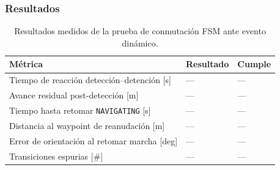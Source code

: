 \subsubsection{Resultados}

\begin{table}[H]
\centering
\small
\begin{tabular}{p{8.8cm} p{2.2cm} p{2.8cm}}
\toprule
\textbf{Métrica} & \textbf{Resultado} & \textbf{Cumple} \\
\midrule
Tiempo de reacción detección--detención [s] & --- & --- \\
Avance residual post-detección [m] & --- & --- \\
Tiempo hasta retomar \texttt{NAVIGATING} [s] & --- & --- \\
Distancia al waypoint de reanudación [m] & --- & --- \\
Error de orientación al retomar marcha [deg] & --- & --- \\
Transiciones espurias [\#] & --- & --- \\
\bottomrule
\end{tabular}
\caption{Resultados medidos de la prueba de conmutación FSM ante evento dinámico.}
\label{tab:resultados_prueba_fsm}
\end{table}
